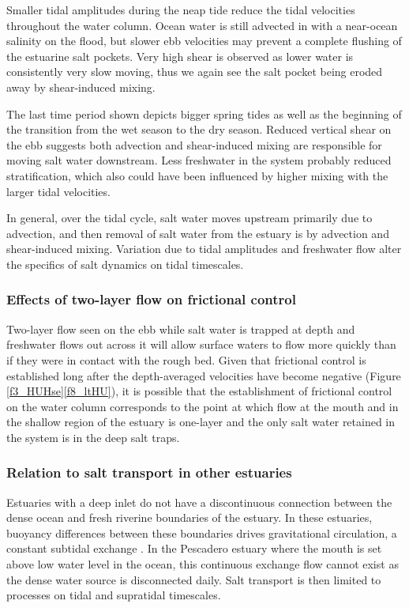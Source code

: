 Smaller tidal amplitudes during the neap tide reduce the tidal velocities
throughout the water column. Ocean water is still advected in with
a near-ocean salinity on the flood, but slower ebb velocities may
prevent a complete flushing of the estuarine salt pockets. Very high
shear is observed as lower water is consistently very slow moving,
thus we again see the salt pocket being eroded away by shear-induced
mixing. 

The last time period shown depicts bigger spring tides as well as
the beginning of the transition from the wet season to the dry season.
Reduced vertical shear on the ebb suggests both advection and shear-induced
mixing are responsible for moving salt water downstream. Less freshwater
in the system probably reduced stratification, which also could have
been influenced by higher mixing with the larger tidal velocities. 

In general, over the tidal cycle, salt water moves upstream primarily
due to advection, and then removal of salt water from the estuary
is by advection and shear-induced mixing. Variation due to tidal amplitudes
and freshwater flow alter the specifics of salt dynamics on tidal
timescales. 


\subsubsection{Effects of two-layer flow on frictional control}

Two-layer flow seen on the ebb while salt water is trapped at depth
and freshwater flows out across it will allow surface waters to flow
more quickly than if they were in contact with the rough bed. Given
that frictional control is established long after the depth-averaged
velocities have become negative (Figure \ref{f3_HUHse}\ref{f8_ltHU}),
it is possible that the establishment of frictional control on the
water column corresponds to the point at which flow at the mouth and
in the shallow region of the estuary is one-layer and the only salt
water retained in the system is in the deep salt traps.


\subsubsection{Relation to salt transport in other estuaries}

Estuaries with a deep inlet do not have a discontinuous connection
between the dense ocean and fresh riverine boundaries of the estuary.
In these estuaries, buoyancy differences between these boundaries
drives gravitational circulation, a constant subtidal exchange \parencite{maccready_advances_2010}.
In the Pescadero estuary where the mouth is set above low water level
in the ocean, this continuous exchange flow cannot exist as the dense
water source is disconnected daily. Salt transport is then limited
to processes on tidal and supratidal timescales.



